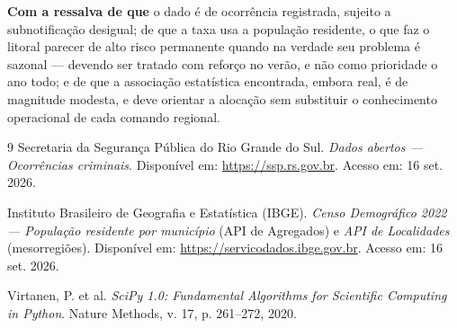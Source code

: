 \documentclass[a4paper,11pt]{article}
\begin{document}
\textbf{Com a ressalva de que} o dado é de ocorrência registrada, sujeito a
subnotificação desigual; de que a taxa usa a população residente, o que faz o
litoral parecer de alto risco permanente quando na verdade seu problema é
sazonal --- devendo ser tratado com reforço no verão, e não como prioridade o ano
todo; e de que a associação estatística encontrada, embora real, é de magnitude
modesta, e deve orientar a alocação sem substituir o conhecimento operacional de
cada comando regional.

\begin{thebibliography}{9}
Secretaria da Segurança Pública do Rio Grande do Sul.
\textit{Dados abertos --- Ocorrências criminais}.
Disponível em: \url{https://ssp.rs.gov.br}. Acesso em: 16 set. 2026.

Instituto Brasileiro de Geografia e Estatística (IBGE).
\textit{Censo Demográfico 2022 --- População residente por município} (API de
Agregados) e \textit{API de Localidades} (mesorregiões).
Disponível em: \url{https://servicodados.ibge.gov.br}. Acesso em: 16 set. 2026.

Virtanen, P. et al. \textit{SciPy 1.0: Fundamental Algorithms for Scientific
Computing in Python}. Nature Methods, v. 17, p. 261--272, 2020.
\end{thebibliography}
\end{document}

